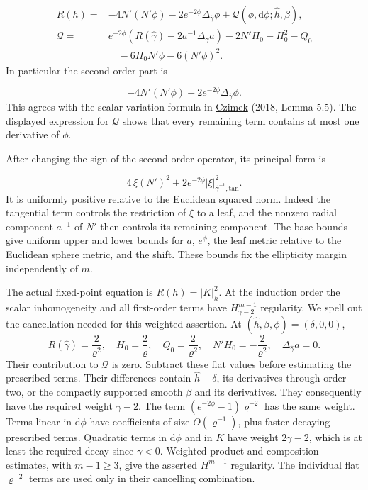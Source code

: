 \documentclass[
  english,
  11pt,
  reqno]{amsart}
\begin{document}
\label{eq:online-extension-scalar-complete-equation} \[
\begin{aligned}
R(h)={}&-4N'(N'\phi)
-2e^{-2\phi}\Delta_{\widehat\gamma}\phi
+\mathcal Q(\phi,\mathrm d\phi;\widehat h,\beta),\\
\mathcal Q={}&
e^{-2\phi}\left(R(\widehat\gamma)
-2a^{-1}\Delta_{\widehat\gamma}a\right)
-2N'H_0-H_0^2-Q_0\\
&\quad-6H_0N'\phi-6(N'\phi)^2.
\end{aligned}
\] In particular the second-order part is

\label{eq:online-extension-scalar-principal-part} \[
-4N'(N'\phi)-2e^{-2\phi}\Delta_{\widehat\gamma}\phi.
\] This agrees with the scalar variation formula in
\hyperref[ref-Czimek2018]{Czimek} (2018, Lemma 5.5). The displayed
expression for \(\mathcal Q\) shows that every remaining term contains
at most one derivative of \(\phi\).

After changing the sign of the second-order operator, its principal form
is

\label{eq:online-extension-scalar-positive-form} \[
4\,\xi(N')^2+
2e^{-2\phi}|\xi|^2_{\widehat\gamma^{-1},\mathrm{tan}}.
\] It is uniformly positive relative to the Euclidean squared norm.
Indeed the tangential term controls the restriction of \(\xi\) to a
leaf, and the nonzero radial component \(a^{-1}\) of \(N'\) then
controls its remaining component. The base bounds give uniform upper and
lower bounds for \(a\), \(e^\phi\), the leaf metric relative to the
Euclidean sphere metric, and the shift. These bounds fix the ellipticity
margin independently of \(m\).

The actual fixed-point equation is \(R(h)=|K|_h^2\). At the induction
order the scalar inhomogeneity and all first-order terms have
\(H^{m-1}_{\gamma-2}\) regularity. We spell out the cancellation needed
for this weighted assertion. At
\((\widehat h,\beta,\phi)=(\delta,0,0)\), \[
R(\widehat\gamma)=\frac2{\varrho^2},
\quad H_0=\frac2\varrho,
\quad Q_0=\frac2{\varrho^2},
\quad N'H_0=-\frac2{\varrho^2},
\quad \Delta_{\widehat\gamma}a=0.
\] Their contribution to \(\mathcal Q\) is zero. Subtract these flat
values before estimating the prescribed terms. Their differences contain
\(\widehat h-\delta\), its derivatives through order two, or the
compactly supported smooth \(\beta\) and its derivatives. They
consequently have the required weight \(\gamma-2\). The term
\((e^{-2\phi}-1)\varrho^{-2}\) has the same weight. Terms linear in
\(\mathrm d\phi\) have coefficients of size \(O(\varrho^{-1})\), plus
faster-decaying prescribed terms. Quadratic terms in \(\mathrm d\phi\)
and in \(K\) have weight \(2\gamma-2\), which is at least the required
decay since \(\gamma<0\). Weighted product and composition estimates,
with \(m-1\ge3\), give the asserted \(H^{m-1}\) regularity. The
individual flat \(\varrho^{-2}\) terms are used only in their cancelling
combination.
\end{document}
